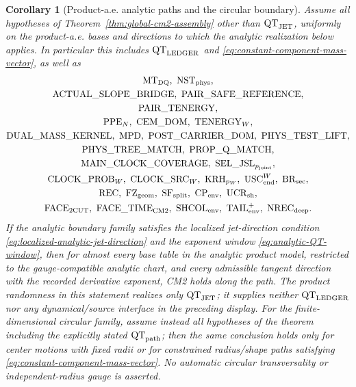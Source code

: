 \documentclass[11pt]{article}
\newtheorem{corollary}[theorem]{Corollary}
\begin{document}
\begin{corollary}[Product-a.e. analytic paths and the circular boundary]
\label{cor:analytic-pathwise-CM2}
Assume all hypotheses of Theorem~\ref{thm:global-cm2-assembly} other than
$\mathrm{QT}_{\rm JET}$, uniformly on the product-a.e. bases and directions
to which the analytic realization below applies.  In
particular this includes $\mathrm{QT}_{\rm LEDGER}$ and
\eqref{eq:constant-component-mass-vector}, as well as
\[
\begin{gathered}
 \mathrm{MT}_{\rm DQ},\ \mathrm{NST}_{\rm phys},\\
 \mathrm{ACTUAL\_SLOPE\_BRIDGE},\ \mathrm{PAIR\_SAFE\_REFERENCE},\\
 \mathrm{PAIR\_TENERGY},\\
 \mathrm{PPE}_{N},\ \mathrm{CEM\_DOM},\ \mathrm{TENERGY}_{W},\\
 \mathrm{DUAL\_MASS\_KERNEL},\ \mathrm{MPD},\
 \mathrm{POST\_CARRIER\_DOM},\ \mathrm{PHYS\_TEST\_LIFT},\\
 \mathrm{PHYS\_TREE\_MATCH},\ \mathrm{PROP\_Q\_MATCH},\\
 \mathrm{MAIN\_CLOCK\_COVERAGE},\
 \mathrm{SEL\_JSL}_{p_{\rm joint}},\\
 \mathrm{CLOCK\_PROB}_{W},\ \mathrm{CLOCK\_SRC}_{W},\
 \mathrm{KRH}_{p_W},\ \mathrm{USC}_{\rm end}^{W},\ \mathrm{BR}_{\rm sec},\\
 \mathrm{REC},\ \mathrm{FZ}_{\rm geom},\ \mathrm{SF}_{\rm split},\
 \mathrm{CP}_{\rm env},\ \mathrm{UCR}_{\rm sh},\\
 \mathrm{FACE}_{\rm 2CUT},\ \mathrm{FACE\_TIME}_{\rm CM2},\
 \mathrm{SHCOL}_{\rm env},\
 \mathrm{TAIL}_{\rm env}^{+},\ \mathrm{NREC}_{\rm deep}.
\end{gathered}
\]
If the analytic boundary family
satisfies the localized jet-direction condition
\eqref{eq:localized-analytic-jet-direction} and the exponent window
\eqref{eq:analytic-QT-window}, then for almost every base table in the
analytic product model, restricted to the gauge-compatible analytic chart,
and every admissible tangent direction with the
recorded derivative exponent, CM2 holds along the path.
The product randomness in this statement realizes only
$\mathrm{QT}_{\rm JET}$; it supplies neither
$\mathrm{QT}_{\rm LEDGER}$ nor any dynamical/source interface in the
preceding display.
For the finite-dimensional circular family, assume instead all hypotheses
of the theorem including the explicitly stated $\mathrm{QT}_{\rm path}$;
then the same conclusion holds only for center motions with fixed radii or
for constrained radius/shape paths satisfying
\eqref{eq:constant-component-mass-vector}.  No automatic circular
transversality or independent-radius gauge is asserted.
\end{corollary}
\end{document}
